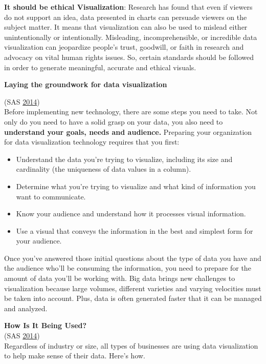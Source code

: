 \documentclass[]{book}
\providecommand{\tightlist}{%
  \setlength{\itemsep}{0pt}\setlength{\parskip}{0pt}}
\begin{document}
\textbf{It should be ethical Visualization}:
Research has found that even if viewers do not support an idea, data presented in charts can persuade viewers on the subject matter. It means that visualization can also be used to mislead either unintentionally or intentionally. Misleading, incomprehensible, or incredible data visualization can jeopardize people's trust, goodwill, or faith in research and advocacy on vital human rights issues. So, certain standards should be followed in order to generate meaningful, accurate and ethical visuals.

\textbf{Laying the groundwork for data visualization}

(SAS \protect\hyperlink{ref-why_dataviz_matters}{2014})\\
Before implementing new technology, there are some steps you need to take. Not only do you need to have a solid grasp on your data, you also need to \textbf{understand your goals, needs and audience.} Preparing your organization for data visualization technology requires that you first:

\begin{itemize}
\tightlist
\item
  Understand the data you're trying to visualize, including its size and cardinality (the uniqueness of data values in a column).
\item
  Determine what you're trying to visualize and what kind of information you want to communicate.
\item
  Know your audience and understand how it processes visual information.
\item
  Use a visual that conveys the information in the best and simplest form for your audience.
\end{itemize}

Once you've answered those initial questions about the type of data you have and the audience who'll be consuming the information, you need to prepare for the amount of data you'll be working with. Big data brings new challenges to visualization because large volumes, different varieties and varying velocities must be taken into account. Plus, data is often generated faster that it can be managed and analyzed.

\textbf{How Is It Being Used?}\\
(SAS \protect\hyperlink{ref-why_dataviz_matters}{2014})\\
Regardless of industry or size, all types of businesses are using data visualization to help make sense of their data. Here's how.
\end{document}

